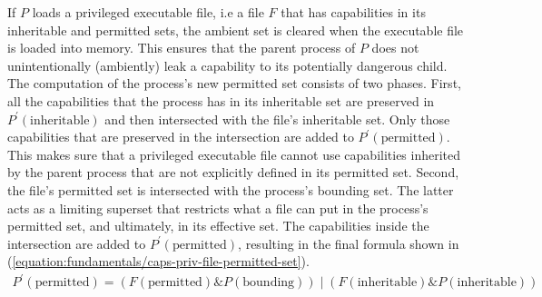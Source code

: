 If $P$ loads a privileged executable file, i.e a file $F$ that has capabilities in its inheritable and permitted sets, 
the ambient set is cleared when the executable file is loaded into memory. This ensures that 
the parent process of $P$ does not unintentionally (ambiently) leak a capability to its potentially 
dangerous child. The computation of the process's new permitted set consists of two phases.
First, all the capabilities that the process has in its inheritable set are preserved in 
$P^{\prime}(\textrm{inheritable})$ and then intersected with the file's inheritable set.
Only those capabilities that are preserved in the intersection are added to $P^{\prime}(\textrm{permitted})$. 
This makes sure that a privileged executable file cannot use capabilities inherited by 
the parent process that are not explicitly defined in its permitted set.
Second, the file's permitted set is intersected with the process's bounding set.
The latter acts as a limiting superset that restricts what a file can put in the process's
permitted set, and ultimately, in its effective set. 
The capabilities inside the intersection are added to $P^{\prime}(\textrm{permitted})$, resulting 
in the final formula shown in (\ref{equation:fundamentals/caps-priv-file-permitted-set}).
\begin{align}
    P^{\prime}({\textrm{permitted}}) = (F(\textrm{permitted}) \mathbin{\&} P(\textrm{bounding})) \mathbin{|} (F(\textrm{inheritable}) \mathbin{\&} P(\textrm{inheritable}))
    \label{equation:fundamentals/caps-priv-file-permitted-set}
\end{align}

